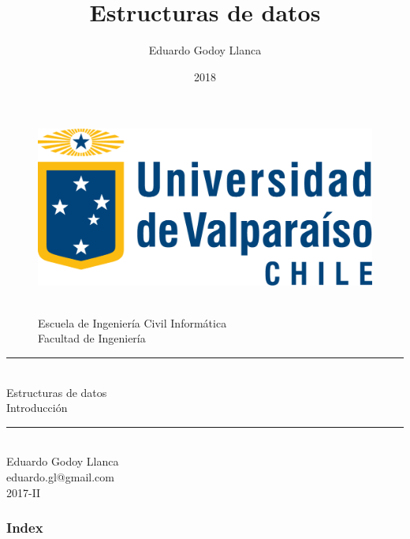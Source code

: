 \documentclass{beamer} %
\title{Estructuras de datos}   %
\author{Eduardo Godoy Llanca} %
\date{2018}                    %
\institute{Universidad de Valparaíso}                 %
\newcommand{\HRule}{\rule{\linewidth}{0.2mm}\\[1ex]}
\begin{document}
%

\begin{frame}[plain]
  \begin{figure}[h]
    \begin{minipage}{0.3\textwidth}
    \includegraphics[width=.9\textwidth]{./image/logo-UV.png}
    \end{minipage}
    \begin{minipage}{0.65\textwidth}
     $~$\\[3.6ex]
     \footnotesize{Escuela de Ingeniería Civil Informática}\\
     \footnotesize{Facultad de Ingeniería}
    \end{minipage}
  \end{figure}
  \begin{center}
    \vspace{1ex}
    \HRule
    \Large{Estructuras de datos}\\{\small Introducción}\\[-1ex]
    \HRule\vspace{1ex}
    \large{Eduardo Godoy Llanca}\\[.5ex]\footnotesize{eduardo.gl@gmail.com}\\[6ex] {\tiny 2017-II}\\[6ex]
  \end{center}
\end{frame}

\begin{frame}
 \frametitle{Index}
 \scriptsize 			%
 \tableofcontents		%
\end{frame}
\end{document}
